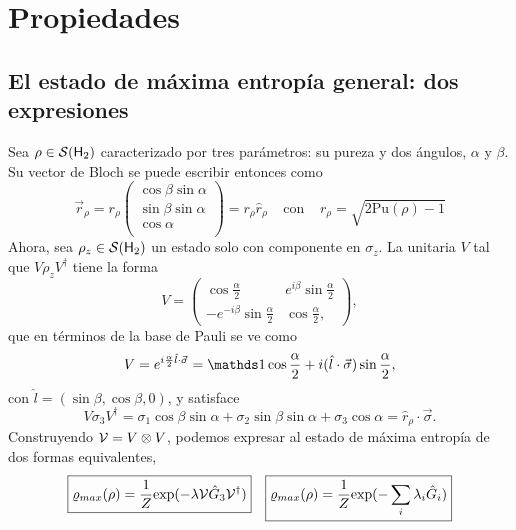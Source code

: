 \section{Propiedades}



\subsection{El estado de máxima entropía general: dos expresiones}
Sea $\rho\in\mathcal{S}({\sf H}_{2})$ caracterizado por tres parámetros: su pureza y dos ángulos, $\alpha$ y $\beta$. Su vector de Bloch se puede escribir entonces como
\begin{equation}
  \vec{r}_{\rho}=r_{\rho}\begin{pmatrix}
    \cos{\beta}\sin{\alpha}\\
    \sin{\beta}\sin{\alpha}\\
    \cos{\alpha}\\
  \end{pmatrix}=r_{\rho}\hat{r}_{\rho} \; \; \; \; \text{con} \; \; \; \; r_{\rho}=\sqrt{2\text{Pu}(\rho)-1}
\end{equation}
Ahora, sea $\rho_{z}\in\mathcal{S}({\sf H}_{2})$ un estado solo con componente en $\sigma_{z}$. La unitaria $V$ tal que $V\rho_{z} V^{\dag}$ tiene la forma
\begin{equation}
  V=
  \begin{pmatrix}
      \cos{\frac{\alpha}{2}} & e^{i\beta}\sin{\frac{\alpha}{2}}\\
      -e^{-i\beta}\sin{\frac{\alpha}{2}}& \cos{\frac{\alpha}{2}},
  \end{pmatrix},
\end{equation}
que en términos de la base de Pauli se ve como
\begin{equation}
  V=e^{i\frac{\alpha}{2} \hat{l}\cdot \vec{\sigma}}=\Id \cos{\frac{\alpha}{2}}+i(\hat{l}\cdot \vec{\sigma})\sin{\frac{\alpha}{2}},
\end{equation}
con $\hat{l}=(\sin{\beta},\cos{\beta},0)$, y satisface
\begin{equation}\label{eq:VsigmazV}
  V\sigma_{3}V^{\dag}=\sigma_{1}\cos{\beta}\sin{\alpha}+\sigma_{2}\sin{\beta}\sin{\alpha}+\sigma_{3}\cos{\alpha}=\hat{r}_{\rho}\cdot\vec{\sigma}.
\end{equation}
Construyendo $\mathcal{V}=V\otimes V$, podemos expresar al estado de máxima entropía de dos formas equivalentes,
\begin{align}\label{eq:MaxEntTwoExpr}
  \boxed{\varrho_{max}(\rho)=\frac{1}{Z}\text{exp}(-\lambda\mathcal{V}\hat{G}_{3}\mathcal{V}^{\dag})} && \boxed{\varrho_{max}(\rho)=\frac{1}{Z}\text{exp}(-\sum_{i}\lambda_{i}\hat{G}_{i})}
\end{align}

